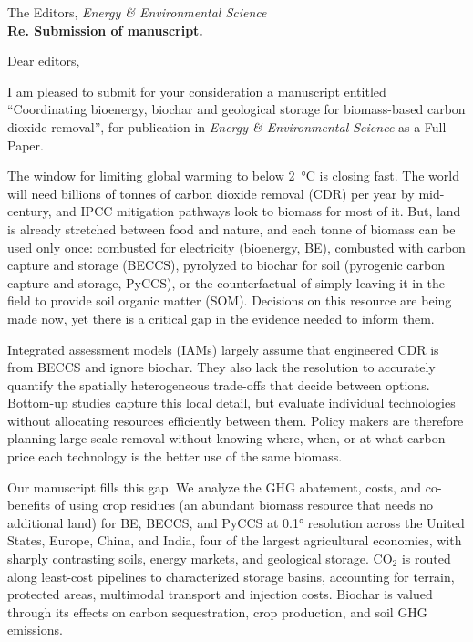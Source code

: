 
\signature{\Who\Title\\ }

\begin{letter}{
		The Editors, \emph{Energy \& Environmental Science}\\
	\vspace{0.01\textheight} 
    \textbf{Re.  Submission of manuscript.}
	\vspace{-0.04\textheight} 
}

\opening{Dear editors,}

I am pleased to submit for your consideration a manuscript entitled ``Coordinating bioenergy, biochar and geological storage for biomass-based carbon dioxide removal'', for publication in \emph{Energy \& Environmental Science} as a Full Paper.

The window for limiting global warming to below 2~°C is closing fast. The world will need billions of tonnes of carbon dioxide removal (CDR) per year by mid-century, and IPCC mitigation pathways look to biomass for most of it. But, land is already stretched between food and nature, and each tonne of biomass can be used only once: combusted for electricity (bioenergy, BE), combusted with carbon capture and storage (BECCS), pyrolyzed to biochar for soil (pyrogenic carbon capture and storage, PyCCS), or the counterfactual of simply leaving it in the field to provide soil organic matter (SOM). Decisions on this resource are being made now, yet there is a critical gap in the evidence needed to inform them.

Integrated assessment models (IAMs) largely assume that engineered CDR is from BECCS and ignore biochar. They also lack the resolution to accurately quantify the spatially heterogeneous trade-offs that decide between options. Bottom-up studies capture this local detail, but evaluate individual technologies without allocating resources efficiently between them. Policy makers are therefore planning large-scale removal without knowing where, when, or at what carbon price each technology is the better use of the same biomass.

Our manuscript fills this gap. We analyze the GHG abatement, costs, and co-benefits of using crop residues (an abundant biomass resource that needs no additional land) for BE, BECCS, and PyCCS at 0.1° resolution across the United States, Europe, China, and India, four of the largest agricultural economies, with sharply contrasting soils, energy markets, and geological storage. CO$_{2}$ is routed along least-cost pipelines to characterized storage basins, accounting for terrain, protected areas, multimodal transport and injection costs. Biochar is valued through its effects on carbon sequestration, crop production, and soil GHG emissions. 


\end{letter}
